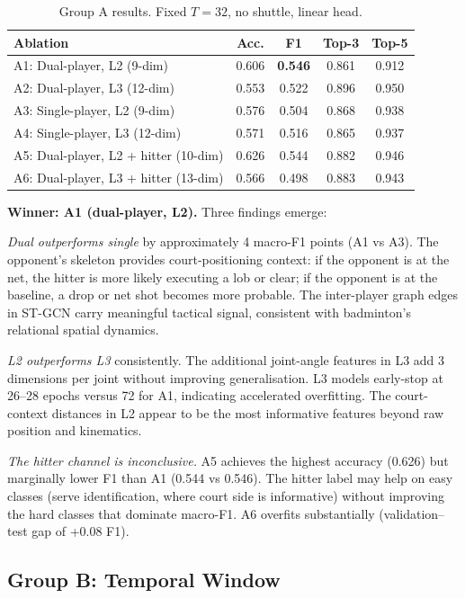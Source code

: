 \documentclass[11pt,a4paper]{article}
\begin{document}
\begin{table}[H]
\centering
\caption{Group A results. Fixed $T=32$, no shuttle, linear head.}
\label{tab:groupA}
\begin{tabular}{@{}lcccc@{}}
\toprule
\textbf{Ablation} & \textbf{Acc.} & \textbf{F1} & \textbf{Top-3} & \textbf{Top-5} \\
\midrule
A1: Dual-player, L2 (9-dim) & 0.606 & \textbf{0.546} & 0.861 & 0.912 \\
A2: Dual-player, L3 (12-dim) & 0.553 & 0.522 & 0.896 & 0.950 \\
A3: Single-player, L2 (9-dim) & 0.576 & 0.504 & 0.868 & 0.938 \\
A4: Single-player, L3 (12-dim) & 0.571 & 0.516 & 0.865 & 0.937 \\
A5: Dual-player, L2 + hitter (10-dim) & 0.626 & 0.544 & 0.882 & 0.946 \\
A6: Dual-player, L3 + hitter (13-dim) & 0.566 & 0.498 & 0.883 & 0.943 \\
\bottomrule
\end{tabular}
\end{table}

\textbf{Winner: A1 (dual-player, L2).} Three findings emerge:

\textit{Dual outperforms single} by approximately 4 macro-F1 points (A1 vs A3). The opponent's skeleton provides court-positioning context: if the opponent is at the net, the hitter is more likely executing a lob or clear; if the opponent is at the baseline, a drop or net shot becomes more probable. The inter-player graph edges in ST-GCN carry meaningful tactical signal, consistent with badminton's relational spatial dynamics.

\textit{L2 outperforms L3} consistently. The additional joint-angle features in L3 add 3 dimensions per joint without improving generalisation. L3 models early-stop at 26--28 epochs versus 72 for A1, indicating accelerated overfitting. The court-context distances in L2 appear to be the most informative features beyond raw position and kinematics.

\textit{The hitter channel is inconclusive.} A5 achieves the highest accuracy (0.626) but marginally lower F1 than A1 (0.544 vs 0.546). The hitter label may help on easy classes (serve identification, where court side is informative) without improving the hard classes that dominate macro-F1. A6 overfits substantially (validation--test gap of +0.08 F1).

\subsection{Group B: Temporal Window}
\end{document}
